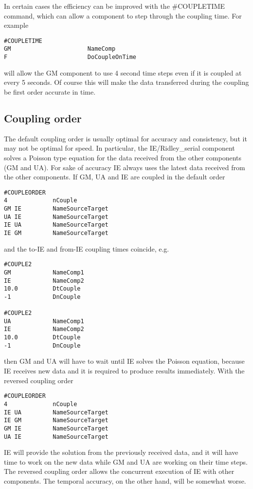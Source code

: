 In certain cases the efficiency can be improved with the
\#COUPLETIME command, which can allow a component to 
step through the coupling time. For example
\begin{verbatim}
#COUPLETIME
GM                      NameComp
F                       DoCoupleOnTime
\end{verbatim}
will allow the GM component to use 4 second time steps even
if it is coupled at every 5 seconds. Of course this will
make the data transferred during the coupling be 
first order accurate in time.

\subsection{Coupling order}

The default coupling order is usually optimal for accuracy
and consistency, but it may not be optimal for speed.
In particular, the IE/Ridley\_serial component solves
a Poisson type equation for the data received from the 
other components (GM and UA). For sake of accuracy
IE always uses the latest data received from the other
components. If GM, UA and IE are coupled
in the default order
\begin{verbatim}
#COUPLEORDER
4             nCouple	  
GM IE         NameSourceTarget
UA IE         NameSourceTarget
IE UA         NameSourceTarget
IE GM         NameSourceTarget
\end{verbatim}
and the to-IE and from-IE coupling times coincide, e.g.
\begin{verbatim}
#COUPLE2
GM            NameComp1
IE            NameComp2
10.0          DtCouple
-1            DnCouple

#COUPLE2
UA            NameComp1
IE            NameComp2
10.0          DtCouple
-1            DnCouple
\end{verbatim}
then GM and UA will have to wait until IE solves
the Poisson equation, because IE receives new data
and it is required to produce results immediately.
With the reversed coupling order
\begin{verbatim}
#COUPLEORDER
4             nCouple	  
IE UA	      NameSourceTarget
IE GM	      NameSourceTarget
GM IE	      NameSourceTarget
UA IE	      NameSourceTarget
\end{verbatim}
IE will provide the solution from the previously received data,
and it will have time to work on the new data while GM and UA
are working on their time steps. The reversed coupling order
allows the concurrent execution of IE with other components.
The temporal accuracy, on the other hand, will be somewhat worse.

